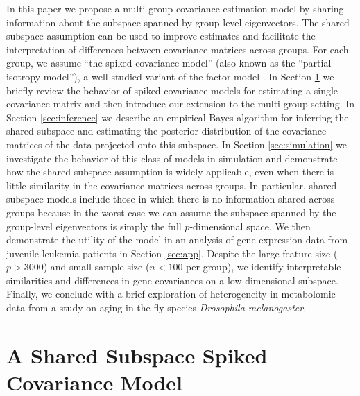 \documentclass[12pt]{article}
\begin{document}
In this paper we propose a multi-group covariance estimation model by
sharing information about the subspace spanned by group-level
eigenvectors.  The shared subspace assumption can be used to improve
estimates and facilitate the interpretation of differences between
covariance matrices across groups.  For each group, we assume ``the
spiked covariance model'' (also known as the ``partial isotropy
model''), a well studied variant of the factor model
\citep{Mardia1980, Johnstone2001}.  In Section \ref{sec:shared} we
briefly review the behavior of spiked covariance models for estimating
a single covariance matrix and then introduce our extension to the
multi-group setting.  In Section \ref{sec:inference} we describe an
empirical Bayes algorithm for inferring the shared subspace and
estimating the posterior distribution of the covariance matrices of
the data projected onto this subspace.  In Section
\ref{sec:simulation} we investigate the behavior of this class of
models in simulation and demonstrate how the shared subspace
assumption is widely applicable, even when there is little similarity
in the covariance matrices across groups.  In particular, shared
subspace models include those in which there is no information shared
across groups because in the worst case we can assume the subspace
spanned by the group-level eigenvectors is simply the full
$p$-dimensional space.  We then demonstrate the utility of the model
in an analysis of gene expression data from juvenile leukemia patients
in Section \ref{sec:app}.  Despite the large feature size ($p > 3000$)
and small sample size ($n < 100$ per group), we identify interpretable
similarities and differences in gene covariances on a low dimensional
subspace.  Finally, we conclude with a brief exploration of
heterogeneity in metabolomic data from a study on aging in the fly
species \textit{Drosophila melanogaster}.  

\section{A Shared Subspace Spiked Covariance Model}
\label{sec:shared}

\end{document}
